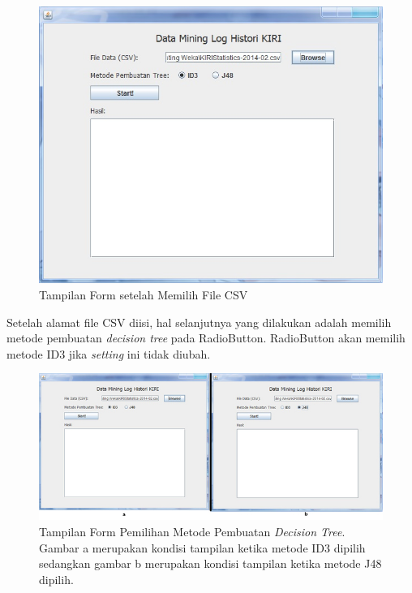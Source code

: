 \begin{figure}[H]
\centering
\includegraphics[scale=0.7]{Gambar/GUI3.jpg}
\caption[Tampilan Form setelah Memilih File CSV]{Tampilan Form setelah Memilih File CSV} 
\label{fig:GUI3}
\end{figure}

Setelah alamat file CSV diisi, hal selanjutnya yang dilakukan adalah memilih metode pembuatan \textsl{decision tree} pada RadioButton. RadioButton akan memilih metode ID3 jika \textsl{setting} ini tidak diubah.

\begin{figure}[H]
\centering
\includegraphics[scale=0.7]{Gambar/GUI3and4.jpg}
\caption[Tampilan Form Pemilihan Metode Pembuatan \textsl{Decision Tree}]{Tampilan Form Pemilihan Metode Pembuatan \textsl{Decision Tree}. Gambar a merupakan kondisi tampilan ketika metode ID3 dipilih sedangkan gambar b merupakan kondisi tampilan ketika metode J48 dipilih.} 
\label{fig:GUI3and4}
\end{figure}


